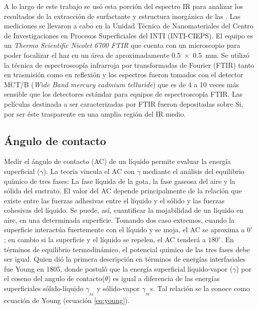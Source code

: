 		A lo largo de este trabajo se usó esta porción del espectro IR para analizar los resultados de la extracción de surfactante y estructura inorgánica de las \pdm. Las mediciones se llevaron a cabo en la Unidad Técnica de Nanomateriales del Centro de Investigaciones en Procesos Superficiales del INTI (INTI-CIEPS). El equipo es un \textit{Thermo Scientific Nicolet 6700 FTIR} que cuenta con un microscopio para poder focalizar el haz en un área de aproximadamente \SI{0.5x0.5}{\mm}. Se utilizó la técnica de espectroscopía infrarroja por transformadas de Fourier (FTIR) tanto en trasmisión como en reflexión y los espectros fueron tomados con el detector MCT/B (\textit{Wide Band mercury cadmium telluride}) que es de 4 a 10 veces más sensible que los detectores estándar para equipos de espectroscopía FTIR.\cite{Nicholet2007} Las películas destinada a ser caracterizadas por FTIR fueron depositadas sobre Si, por ser éste trasparente en una amplia región del IR medio.

	\subsection{Ángulo de contacto}

		Medir el ángulo de contacto (AC) de un líquido permite evaluar la energía superficial ($\gamma$). La teoría vincula el AC con $\gamma$ mediante el análisis del equilibrio químico de tres fases: La fase líquida de la gota, la fase gaseosa del aire y la sólida del sustrato. El valor del AC depende principalmente de la relación que existe entre las fuerzas adhesivas entre el líquido y el sólido y las fuerzas cohesivas del líquido. Se puede, así, cuantificar la mojabilidad de un líquido en aire, en una determinada superficie.\cite{findenegg1997} Tomando dos caso extremos, cuando la superficie interactúa fuertemente con el líquido y se moja, el AC se aproxima a $0^{\circ}$; en cambio si la superficie y el líquido se repelen, el AC tenderá a $180^{\circ}$. En términos de equilibrio termodinámico, el potencial químico de las tres fases  debe ser igual. Quien dió la primera descripción en términos de energías interfasiales fue Young en 1805\cite{young1805}, donde postuló que la energía superficial líquido-vapor ($\gamma$) por el coseno del angulo de contacto($\theta$) es igual a diferencia de las energías superficiales sólido-líquido $\gamma_{_{SL}}$ y sólido-vapor $\gamma_{_{SV}}$s. Tal relación se la conoce como ecuación de Young (ecuación \ref{eq:young}).

